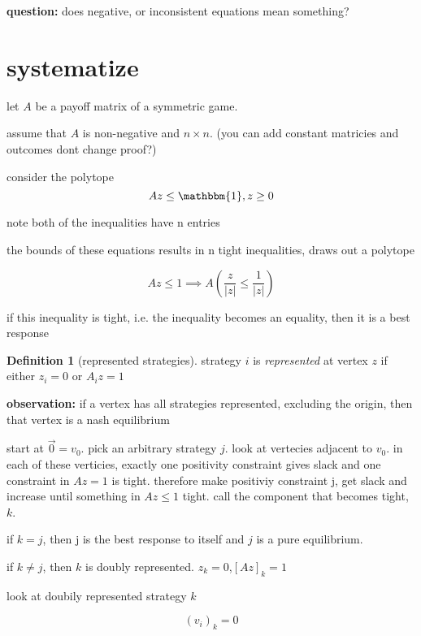 \documentclass{article}
\theoremstyle{definition}
\newtheorem{definition}{Definition}
\newcommand{\norm}[1]{\lvert #1 \rvert}
\begin{document}
\textbf{question:} does negative, or inconsistent equations mean something? 

\section{systematize }

let \(A\) be a payoff matrix of a symmetric game.

assume that \(A \) is non-negative and \(n\times n\). (you can add constant matricies and outcomes dont change proof?)

consider the polytope 
\begin{equation}
    Az\leq \mathbbm{1}, z\geq 0
\end{equation}

note both of the inequalities have n entries

the bounds of these equations results in n tight inequalities, draws out a polytope


\begin{equation}
    Az\leq 1 \implies A\left(\frac{z}{\norm{z}}\leq \frac{1}{\norm{z}}\right)
\end{equation}


if this inequality is tight, i.e. the inequality becomes an equality, then it is a best response

\begin{definition}[represented strategies]
    strategy \(i\) is \emph{represented} at vertex \(z\) if either \(z_i=0\) or \(A_iz=1\)
\end{definition}


\textbf{observation: } if a vertex has all strategies represented, excluding the origin, then that vertex is a nash equilibrium

start at \(\vec 0=v_0\). pick an arbitrary strategy \(j\). look at vertecies adjacent to \(v_0\). in each of these verticies, exactly one positivity constraint gives slack and one constraint in \(Az=1\) is tight. therefore make positiviy constraint j, get slack and increase until something in \(Az\leq1\) tight. call the component that becomes tight, \(k\).

if \(k=j\), then j is the best response to itself and \(j\) is a pure equilibrium.

if \(k\neq j\), then \(k\) is doubly represented. \(z_k=0\),\([Az]_k=1\)

look at doubily represented strategy \(k\)

\begin{equation}
    (v_i)_k=0 
\end{equation}
\end{document}
